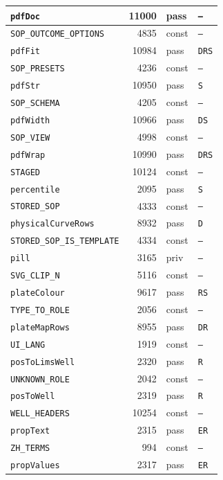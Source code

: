 {\begin{xltabular}{\linewidth}{|l|r|X|X|}
\texttt{pdfDoc} & 11000 & pass & \texttt{--} \\ \hline
\texttt{SOP\_OUTCOME\_OPTIONS} & 4835 & const & \texttt{--} \\ \hline
\texttt{pdfFit} & 10984 & pass & \texttt{DRS} \\ \hline
\texttt{SOP\_PRESETS} & 4236 & const & \texttt{--} \\ \hline
\texttt{pdfStr} & 10950 & pass & \texttt{S} \\ \hline
\texttt{SOP\_SCHEMA} & 4205 & const & \texttt{--} \\ \hline
\texttt{pdfWidth} & 10966 & pass & \texttt{DS} \\ \hline
\texttt{SOP\_VIEW} & 4998 & const & \texttt{--} \\ \hline
\texttt{pdfWrap} & 10990 & pass & \texttt{DRS} \\ \hline
\texttt{STAGED} & 10124 & const & \texttt{--} \\ \hline
\texttt{percentile} & 2095 & pass & \texttt{S} \\ \hline
\texttt{STORED\_SOP} & 4333 & const & \texttt{--} \\ \hline
\texttt{physicalCurveRows} & 8932 & pass & \texttt{D} \\ \hline
\texttt{STORED\_SOP\_IS\_TEMPLATE} & 4334 & const & \texttt{--} \\ \hline
\texttt{pill} & 3165 & priv & \texttt{--} \\ \hline
\texttt{SVG\_CLIP\_N} & 5116 & const & \texttt{--} \\ \hline
\texttt{plateColour} & 9617 & pass & \texttt{RS} \\ \hline
\texttt{TYPE\_TO\_ROLE} & 2056 & const & \texttt{--} \\ \hline
\texttt{plateMapRows} & 8955 & pass & \texttt{DR} \\ \hline
\texttt{UI\_LANG} & 1919 & const & \texttt{--} \\ \hline
\texttt{posToLimsWell} & 2320 & pass & \texttt{R} \\ \hline
\texttt{UNKNOWN\_ROLE} & 2042 & const & \texttt{--} \\ \hline
\texttt{posToWell} & 2319 & pass & \texttt{R} \\ \hline
\texttt{WELL\_HEADERS} & 10254 & const & \texttt{--} \\ \hline
\texttt{propText} & 2315 & pass & \texttt{ER} \\ \hline
\texttt{ZH\_TERMS} & 994 & const & \texttt{--} \\ \hline
\texttt{propValues} & 2317 & pass & \texttt{ER} \\ \hline

\end{xltabular}}
